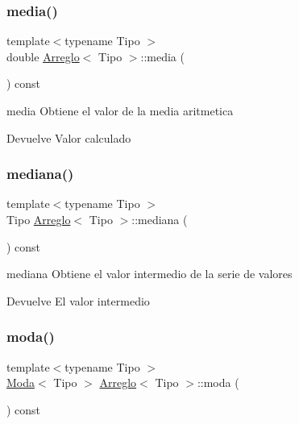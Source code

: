 \subsubsection{\texorpdfstring{media()}{media()}}
{\footnotesize\ttfamily template$<$typename Tipo $>$ \\
double \hyperlink{class_arreglo}{Arreglo}$<$ Tipo $>$\+::media (\begin{DoxyParamCaption}{ }\end{DoxyParamCaption}) const}



media Obtiene el valor de la media aritmetica 

\begin{DoxyReturn}{Devuelve}
Valor calculado 
\end{DoxyReturn}
\mbox{\label{class_arreglo_a84a3c8f3187822db817d8bb29e377e07}} 
\subsubsection{\texorpdfstring{mediana()}{mediana()}}
{\footnotesize\ttfamily template$<$typename Tipo $>$ \\
Tipo \hyperlink{class_arreglo}{Arreglo}$<$ Tipo $>$\+::mediana (\begin{DoxyParamCaption}{ }\end{DoxyParamCaption}) const}



mediana Obtiene el valor intermedio de la serie de valores 

\begin{DoxyReturn}{Devuelve}
El valor intermedio 
\end{DoxyReturn}
\mbox{\label{class_arreglo_aa88660ef09061682eb6e2a78e96b76c1}} 
\subsubsection{\texorpdfstring{moda()}{moda()}}
{\footnotesize\ttfamily template$<$typename Tipo $>$ \\
\hyperlink{struct_moda}{Moda}$<$ Tipo $>$ \hyperlink{class_arreglo}{Arreglo}$<$ Tipo $>$\+::moda (\begin{DoxyParamCaption}{ }\end{DoxyParamCaption}) const}



